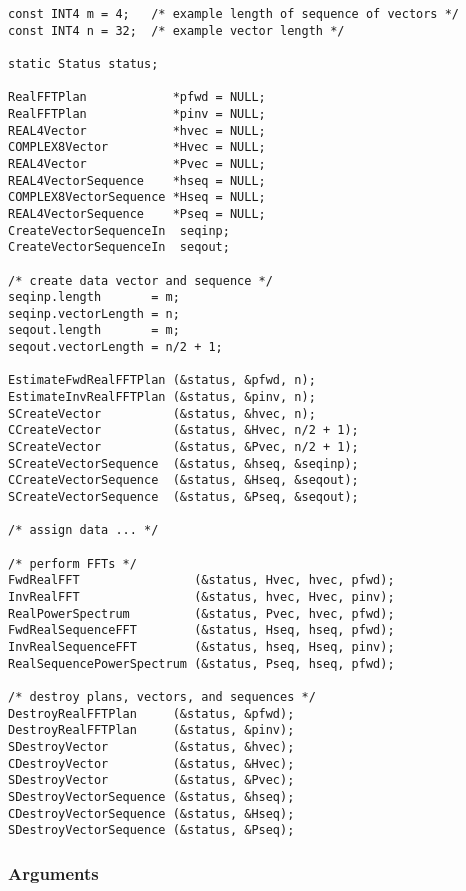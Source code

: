 \documentclass{article}
\begin{document}
\begin{verbatim}
const INT4 m = 4;   /* example length of sequence of vectors */
const INT4 n = 32;  /* example vector length */

static Status status; 

RealFFTPlan            *pfwd = NULL;
RealFFTPlan            *pinv = NULL;
REAL4Vector            *hvec = NULL;
COMPLEX8Vector         *Hvec = NULL;
REAL4Vector            *Pvec = NULL;
REAL4VectorSequence    *hseq = NULL;
COMPLEX8VectorSequence *Hseq = NULL;
REAL4VectorSequence    *Pseq = NULL;
CreateVectorSequenceIn  seqinp;
CreateVectorSequenceIn  seqout;

/* create data vector and sequence */
seqinp.length       = m;
seqinp.vectorLength = n;
seqout.length       = m;
seqout.vectorLength = n/2 + 1;

EstimateFwdRealFFTPlan (&status, &pfwd, n);
EstimateInvRealFFTPlan (&status, &pinv, n);
SCreateVector          (&status, &hvec, n);
CCreateVector          (&status, &Hvec, n/2 + 1);
SCreateVector          (&status, &Pvec, n/2 + 1);
SCreateVectorSequence  (&status, &hseq, &seqinp);
CCreateVectorSequence  (&status, &Hseq, &seqout);
SCreateVectorSequence  (&status, &Pseq, &seqout);

/* assign data ... */

/* perform FFTs */
FwdRealFFT                (&status, Hvec, hvec, pfwd);
InvRealFFT                (&status, hvec, Hvec, pinv);
RealPowerSpectrum         (&status, Pvec, hvec, pfwd);
FwdRealSequenceFFT        (&status, Hseq, hseq, pfwd);
InvRealSequenceFFT        (&status, hseq, Hseq, pinv);
RealSequencePowerSpectrum (&status, Pseq, hseq, pfwd);

/* destroy plans, vectors, and sequences */
DestroyRealFFTPlan     (&status, &pfwd);
DestroyRealFFTPlan     (&status, &pinv);
SDestroyVector         (&status, &hvec);
CDestroyVector         (&status, &Hvec);
SDestroyVector         (&status, &Pvec);
SDestroyVectorSequence (&status, &hseq);
CDestroyVectorSequence (&status, &Hseq);
SDestroyVectorSequence (&status, &Pseq);
\end{verbatim}

\subsubsection{Arguments}

\end{document}
